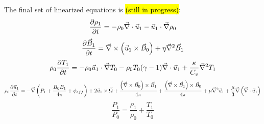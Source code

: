 \documentclass[apj,onecolumn]{emulateapj}
\newcommand{\uvec}{\ensuremath{\vec{u}}} %
\newcommand{\Bvec}{\ensuremath{\vec{B}}} %
\begin{document}
The final set of linearized equations is \hl{(still in progress)}:
\begin{equation}
\dxdt{\rho_1} = -\rho_0\del\cdot\uvec_1 - \uvec_1\cdot\del\rho_0
\end{equation}
\begin{equation}
\dxdt{\Bvec_1} = \del\times\left(\uvec_1\times\Bvec_0\right)+\eta\del^2\Bvec_1
\end{equation}
\begin{equation}
\rho_0\dxdt{T_1} = -\rho_0\uvec_1\cdot\del T_0 -
                     \rho_0 T_0 (\gamma -1)\del\cdot\uvec_1 +
                     \frac{\kappa}{C_v}\del^2T_1
\end{equation}
\begin{equation}
\rho_0\dxdt{\uvec_1} = -\del\left(P_1 +\frac{B_0B_1}{4\pi} + \phi_{eff}\right)
                       +2\uvec_1\times\vec{\Omega} +
          \frac{\left(\del\times\Bvec_0\right)\times \Bvec_1}{4\pi} +
          \frac{\left(\del\times\Bvec_1\right)\times \Bvec_0}{4\pi} +
          \mu\del^2\uvec_1 + \frac{\mu}{3}\del\left(\del\cdot\uvec_1\right)
\end{equation}
\begin{equation}
\frac{P_1}{P_0} = \frac{\rho_1}{\rho_0} + \frac{T_1}{T_0}
\end{equation}




%
\end{document}
